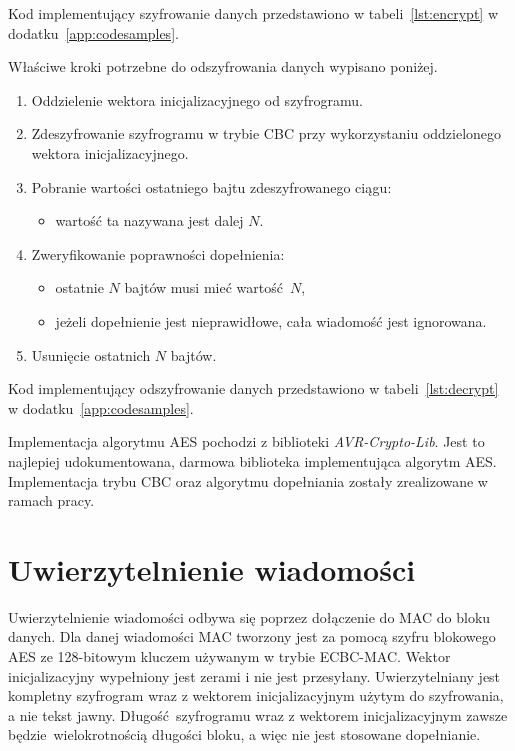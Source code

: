 Kod implementujący szyfrowanie danych przedstawiono w tabeli~\ref{lst:encrypt} w dodatku~\ref{app:codesamples}.

Właściwe kroki potrzebne do odszyfrowania danych wypisano poniżej.

\begin{enumerate}
\item Oddzielenie wektora inicjalizacyjnego od szyfrogramu.
\item Zdeszyfrowanie szyfrogramu w trybie CBC przy wykorzystaniu oddzielonego wektora inicjalizacyjnego.
\item Pobranie wartości ostatniego bajtu zdeszyfrowanego ciągu:
\begin{itemize}
    \item wartość ta nazywana jest dalej $ N $.
\end{itemize}
\item Zweryfikowanie poprawności dopełnienia:
\begin{itemize}
    \item ostatnie $ N $ bajtów musi mieć wartość $ N $,
    \item jeżeli dopełnienie jest nieprawidłowe, cała wiadomość jest ignorowana.
\end{itemize}
\item Usunięcie ostatnich $ N $ bajtów.
\end{enumerate}

Kod implementujący odszyfrowanie danych przedstawiono w tabeli~\ref{lst:decrypt} w dodatku~\ref{app:codesamples}.

Implementacja algorytmu AES pochodzi z biblioteki \emph{AVR-Crypto-Lib}. Jest to najlepiej udokumentowana, darmowa biblioteka implementująca algorytm AES. Implementacja trybu CBC oraz algorytmu dopełniania zostały zrealizowane w ramach pracy.

\section{Uwierzytelnienie wiadomości}
\label{sec:auth}


Uwierzytelnienie wiadomości odbywa się poprzez dołączenie do MAC do bloku danych. Dla danej wiadomości MAC tworzony jest za pomocą szyfru blokowego AES ze 128-bitowym kluczem używanym w trybie ECBC-MAC. Wektor inicjalizacyjny wypełniony jest zerami i nie jest przesyłany. Uwierzytelniany jest kompletny szyfrogram wraz z wektorem inicjalizacyjnym użytym do szyfrowania, a nie tekst jawny. Długość szyfrogramu wraz z wektorem inicjalizacyjnym zawsze będzie wielokrotnością długości bloku, a więc nie jest stosowane dopełnianie.

